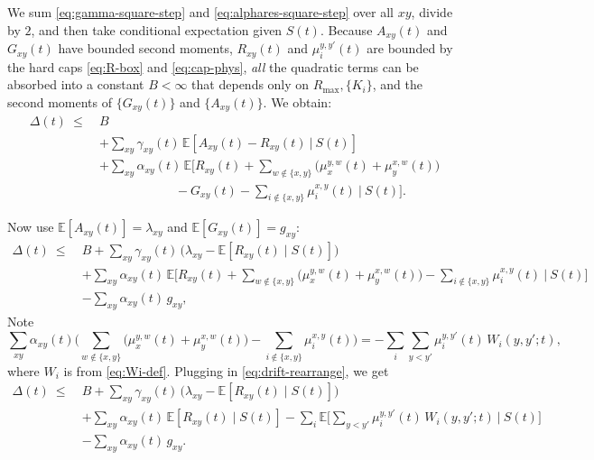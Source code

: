 \documentclass[11pt]{article}
\newcommand{\E}{\mathbb{E}}
\begin{document}
We sum \eqref{eq:gamma-square-step} and \eqref{eq:alphares-square-step} over all $xy$, divide by $2$, and then take conditional expectation given $S(t)$.
Because $A_{xy}(t)$ and $G_{xy}(t)$ have bounded second moments, $R_{xy}(t)$ and $\mu_i^{y,y'}(t)$ are bounded by the hard caps  \eqref{eq:R-box} and \eqref{eq:cap-phys}, \emph{all} the quadratic terms can be absorbed into a constant $B<\infty$ that depends only on $R_{\max}, \{K_i\}$, and the second moments of $\{G_{xy}(t)\}$ and $\{A_{xy}(t)\}$.  We obtain:
\begin{equation}
\begin{aligned}
\Delta(t)\ \le\ &
B\\
&+ \sum_{xy} \gamma_{xy}(t)\,
\E\!\left[ A_{xy}(t)-R_{xy}(t)\ \big|\ S(t)\right] \\
&+ \sum_{xy} \alpha_{xy}(t)\,
\E\!\Big[
R_{xy}(t)
+ \sum_{w\notin\{x,y\}}\big(\mu_x^{y,w}(t)+\mu_y^{x,w}(t)\big) \\
&\qquad\qquad\qquad
- G_{xy}(t)
- \sum_{i\notin\{x,y\}}\mu_i^{x,y}(t)
\ \Big|\ S(t)\Big].
\end{aligned}
\label{eq:drift-before-rearrange}
\end{equation}

Now use $\E[A_{xy}(t)]=\lambda_{xy}$ and $\E[G_{xy}(t)]=g_{xy}$:
\begin{equation}
\begin{aligned}
\Delta(t)\ \le\ &
B
+ \sum_{xy} \gamma_{xy}(t)\,
\big(\lambda_{xy} - \E[R_{xy}(t)\mid S(t)]\big) \\
&+ \sum_{xy} \alpha_{xy}(t)\,
\E\!\Big[
R_{xy}(t)
+ \sum_{w\notin\{x,y\}}\big(\mu_x^{y,w}(t)+\mu_y^{x,w}(t)\big)
- \sum_{i\notin\{x,y\}}\mu_i^{x,y}(t)
\ \Big|\ S(t)\Big]\\
&- \sum_{xy} \alpha_{xy}(t)\,g_{xy},
\end{aligned}
\label{eq:drift-rearrange}
\end{equation} Note
\[
\sum_{xy} \alpha_{xy}(t)
\Big(
\sum_{w\notin\{x,y\}}\big(\mu_x^{y,w}(t)+\mu_y^{x,w}(t)\big)
- \sum_{i\notin\{x,y\}}\mu_i^{x,y}(t)
\Big)
= - \sum_i \sum_{y<y'}
\mu_i^{y,y'}(t)\,W_i(y,y';t),
\]
where $W_i$ is from \eqref{eq:Wi-def}. 
Plugging in \eqref{eq:drift-rearrange}, we get
\begin{equation}
\begin{aligned}
\Delta(t)\ \le\ &
B
+ \sum_{xy} \gamma_{xy}(t)\,
\big(\lambda_{xy} - \E[R_{xy}(t)\mid S(t)]\big) \\
&+ \sum_{xy} \alpha_{xy}(t)\,
\E[R_{xy}(t)\mid S(t)]
- \sum_i \E\!\Big[\sum_{y<y'}\mu_i^{y,y'}(t)\,W_i(y,y';t)\ \Big|\ S(t)\Big] \\
&- \sum_{xy} \alpha_{xy}(t)\,g_{xy}.
\end{aligned}
\label{eq:drift-node-form}
\end{equation}
\end{document}
